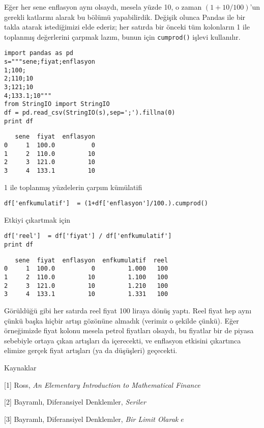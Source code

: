 \documentclass[12pt,fleqn]{article}\usepackage{../../common}
\begin{document}
Eğer her sene enflasyon aynı olsaydı, mesela yüzde 10, o zaman
$(1+10/100)$'un gerekli katlarını alarak bu bölümü yapabilirdik. Değişik
olunca Pandas ile bir takla atarak istediğimizi elde ederiz; her satırda
bir önceki tüm kolonların 1 ile toplanmış değerlerini çarpmak lazım, bunun
için \verb!cumprod()! işlevi kullanılır.

\begin{verbatim}
import pandas as pd
s="""sene;fiyat;enflasyon
1;100;
2;110;10   
3;121;10   
4;133.1;10"""
from StringIO import StringIO
df = pd.read_csv(StringIO(s),sep=';').fillna(0)
print df
\end{verbatim}

\begin{verbatim}
   sene  fiyat  enflasyon
0     1  100.0          0
1     2  110.0         10
2     3  121.0         10
3     4  133.1         10
\end{verbatim}

1 ile toplanmış yüzdelerin çarpım kümülatifi

\begin{verbatim}
df['enfkumulatif']  = (1+df['enflasyon']/100.).cumprod()
\end{verbatim}

Etkiyi çıkartmak için

\begin{verbatim}
df['reel']  = df['fiyat'] / df['enfkumulatif']
print df
\end{verbatim}

\begin{verbatim}
   sene  fiyat  enflasyon  enfkumulatif  reel
0     1  100.0          0         1.000   100
1     2  110.0         10         1.100   100
2     3  121.0         10         1.210   100
3     4  133.1         10         1.331   100
\end{verbatim}

Görüldüğü gibi her satırda reel fiyat 100 liraya dönüş yaptı. Reel fiyat
hep aynı çünkü başka hiçbir artışı gözönüne almadık (verimiz o şekilde
çünkü). Eğer örneğimizde fiyat kolonu mesela petrol fiyatları olsaydı, bu
fiyatlar bir de piyasa sebebiyle ortaya çıkan artışları da içerecekti, ve
enflasyon etkisini çıkartınca elimize gerçek fiyat artışları (ya da
düşüşleri) geçecekti.

Kaynaklar

[1] Ross, {\em An Elementary Introduction to Mathematical Finance}

[2] Bayramlı, Diferansiyel Denklemler, {\em Seriler}

[3] Bayramlı, Diferansiyel Denklemler, {\em Bir Limit Olarak $e$}
\end{document}
